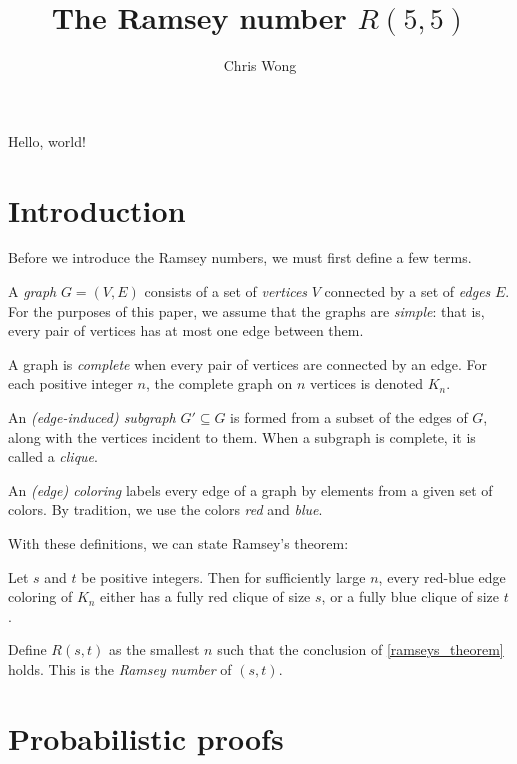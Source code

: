 \documentclass{article}
\begin{document}
\author{Chris Wong}
\title{The Ramsey number $R(5,5)$}
\maketitle

Hello, world!

\section{Introduction}

Before we introduce the Ramsey numbers, we must first define a few terms.

A \textit{graph} $G = (V, E)$ consists of a set of \textit{vertices} $V$ connected by a set of \textit{edges} $E$. For the purposes of this paper, we assume that the graphs are \textit{simple}: that is, every pair of vertices has at most one edge between them.

A graph is \textit{complete} when every pair of vertices are connected by an edge. For each positive integer $n$, the complete graph on $n$ vertices is denoted $K_n$.

An \textit{(edge-induced) subgraph} $G' \subseteq G$ is formed from a subset of the edges of $G$, along with the vertices incident to them. When a subgraph is complete, it is called a \textit{clique}.

An \textit{(edge) coloring} labels every edge of a graph by elements from a given set of colors. By tradition, we use the colors \textit{red} and \textit{blue}.

With these definitions, we can state Ramsey's theorem:

\begin{Theorem} \label{ramseys_theorem}
    Let $s$ and $t$ be positive integers. Then for sufficiently large $n$, every red-blue edge coloring of $K_n$ either has a fully red clique of size $s$, or a fully blue clique of size $t$.
\end{Theorem}

\begin{Definition}
    Define $R(s,t)$ as the smallest $n$ such that the conclusion of \cref{ramseys_theorem} holds. This is the \textit{Ramsey number} of $(s,t)$.
\end{Definition}

\section{Probabilistic proofs}
\end{document}
